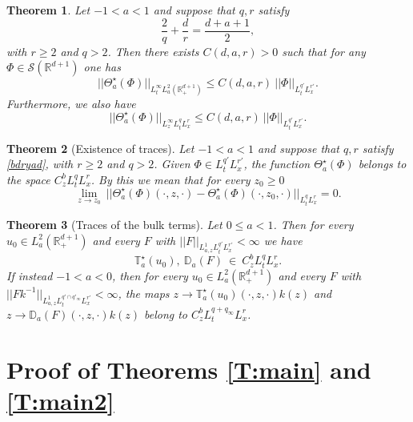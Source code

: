\documentclass[10pt,a4paper]{amsart}
\newtheorem{theorem}{Theorem}
\def \R {\mathbb{R}}
\def \RN {\mathbb{R}_+^{d+1}}
\begin{document}
\begin{theorem}\label{T:V}
Let $-1<a<1$ and suppose that $q, r$
satisfy
\begin{equation}\label{bdryad}
\frac 2q + \frac dr = \frac{d+a+1}2,
\end{equation}
with $r\ge 2$ and 
 $q>2$. Then there exists $C(d,a,r)>0$ such that for any $\Phi\in \mathscr S(\R^{d+1})$ one has
\begin{equation}\label{ok}
||\Theta_a^\star(\Phi)||_{L^\infty_t L^2_a(\RN)} \le C(d,a,r)\ ||\Phi||_{L^{q'}_t L^{r'}_x}.
\end{equation}
Furthermore, we also have
\begin{equation}\label{okk}
||\Theta_a^\star(\Phi)||_{L^\infty_{z} L^q_t L^r_x } \le C(d,a,r)\ ||\Phi||_{L^{q'}_t L^{r'}_x}.
\end{equation}
\end{theorem}

\begin{theorem}[Existence of traces]\label{T:gap}
Let $-1<a<1$ and suppose that $q, r$ satisfy \eqref{bdryad}, with $r\ge 2$ and $q>2$. Given $\Phi\in L^{q'}_t L^{r'}_x$,  
the function $\Theta^\star_a(\Phi)$ belongs to the space $C^b_z L^q_t L^r_x$. By this we mean that for every $z_0\ge 0$
\begin{equation}\label{cont}
\underset{z\to z_0}{\lim}\ ||\Theta^\star_a(\Phi)(\cdot,z,\cdot) - \Theta^\star_a(\Phi)(\cdot,z_0,\cdot)||_{L^q_t L^r_x} = 0.
\end{equation}
\end{theorem}

\begin{theorem}[Traces of the bulk terms]\label{T:gapbulk}
Let $0\le a<1$. Then for every $u_0\in L^2_a(\RN)$ and every $F$ with $||F||_{L^1_{a,z}L^{q'}_tL^{r'}_x}<\infty$ we have
\[
\mathbb T^\star_a(u_0),\ \mathbb D_a(F)\ \in\ C^b_zL^q_tL^r_x.
\]
If instead $-1<a<0$, then for every $u_0\in L^2_a(\RN)$ and every $F$ with $||Fk^{-1}||_{L^1_{a,z}L^{q'\cap q'_\infty}_tL^{r'}_x}<\infty$, the maps $z\to \mathbb T^\star_a(u_0)(\cdot,z,\cdot)k(z)$ and $z\to \mathbb D_a(F)(\cdot,z,\cdot)k(z)$ belong to $C^b_zL^{q+q_\infty}_tL^r_x$.
\end{theorem}

\section{Proof of Theorems \ref{T:main} and \ref{T:main2}}\label{S:main}
\end{document}

